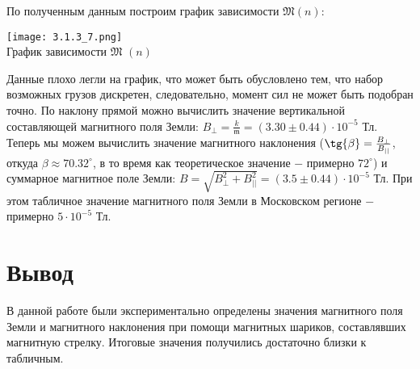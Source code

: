 \documentclass[a4paper,12pt]{article} %
\begin{document}
\hfill \break По полученным данным построим график зависимости $\mathfrak{M} (n)$:

\begin{center}
\texttt{[image: 3.1.3\_7.png]}\\
График зависимости $\mathfrak{M}$ $(n)$\\
\end{center}

\hfill \break Данные плохо легли на график, что может быть обусловлено тем, что набор возможных грузов дискретен, следовательно, момент сил не может быть подобран точно. По наклону прямой можно вычислить значение вертикальной составляющей магнитного поля Земли: $B_{\perp} = \frac{k}{\mathfrak{m}} = (3.30 \pm 0.44) \cdot 10^{-5}$ Тл. Теперь мы можем вычислить значение магнитного наклонения ($\tg{\beta} = \frac {B_{\perp}}{B_{||}}$, откуда $\beta \approx 70.32^{\circ}$, в то время как теоретическое значение $-$ примерно $72^{\circ}$) и суммарное магнитное поле Земли: $B = \sqrt{B_{\perp}^2 + B_{||}^2} = (3.5 \pm 0.44) \cdot 10^{-5}$ Тл. При этом табличное значение магнитного поля Земли в Московском регионе $-$ примерно $5 \cdot 10^{-5}$ Тл.

\section{Вывод}

\hfill \break В данной работе были экспериментально определены значения магнитного поля Земли и магнитного наклонения при помощи магнитных шариков, составлявших магнитную стрелку. Итоговые значения получились достаточно близки к табличным.
\end{document}
